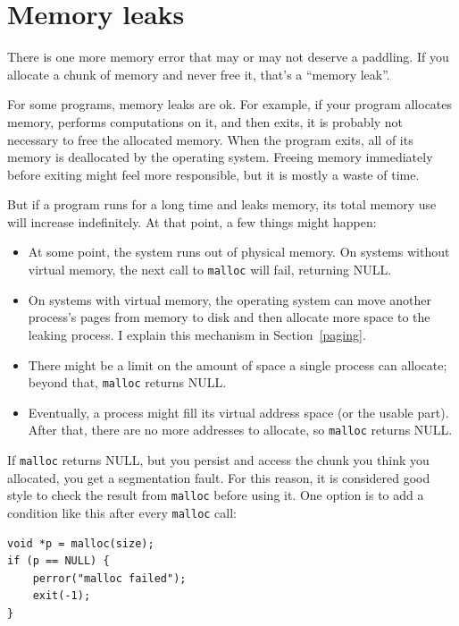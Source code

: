 \documentclass[12pt]{book}
\begin{document}
{\section{Memory leaks}
\label{leak}

There is one more memory error that may or may not deserve a paddling.
If you allocate a chunk of memory and never free it, that's a ``memory
leak''.

For some programs, memory leaks are ok.  For example, if your program
allocates memory, performs computations on it, and then exits, it is
probably not necessary to free the allocated memory.  When the program
exits, all of its memory is deallocated by the operating system.
Freeing memory immediately before exiting might feel more responsible,
but it is mostly a waste of time.

But if a program runs for a long time and leaks memory, its total
memory use will increase indefinitely.  At that point, a few things
might happen:

\begin{itemize}

\item At some point, the system runs out of physical memory.  On
  systems without virtual memory, the next call to {\tt malloc} will
  fail, returning NULL.

\item On systems with virtual memory, the operating system can move
  another process's pages from memory to disk and then allocate
  more space to the leaking process.  I explain this mechanism
  in Section~\ref{paging}.

\item There might be a limit on the amount of space a single
  process can allocate; beyond that, {\tt malloc} returns NULL.

\item Eventually, a process might fill its virtual address space (or
  the usable part).  After that, there are no more addresses to
  allocate, so {\tt malloc} returns NULL.

\end{itemize}

If {\tt malloc} returns NULL, but you persist and access
the chunk you think you allocated, you get a segmentation fault.
For this reason, it is considered good style to check the result from
{\tt malloc} before using it.  One option is to add a condition like
this after every {\tt malloc} call:

\begin{verbatim}
void *p = malloc(size);
if (p == NULL) {
    perror("malloc failed");
    exit(-1);
}
\end{verbatim}

}
\end{document}
